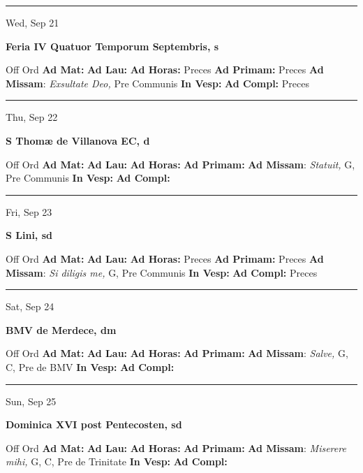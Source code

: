 \documentclass[letterpaper, 10pt]{article}
\begin{document}
\hrule
\begin{center}
Wed, Sep 21
\end{center}\textbf{ \large Feria IV Quatuor Temporum Septembris, \textnormal{\normalsize s}}
\begin{justify}
Off Ord
\textbf{Ad Mat: }
\textbf{Ad Lau: }
\textbf{Ad Horas: }Preces
\textbf{Ad Primam: }Preces
\textbf{Ad Missam}: \textit{Exsultate Deo,} Pre Communis
\textbf{In Vesp: }
\textbf{Ad Compl: }Preces\end{justify}



\hrule
\begin{center}
Thu, Sep 22
\end{center}\textbf{ \large S Thomæ de Villanova EC, \textnormal{\normalsize d}}
\begin{justify}
Off Ord
\textbf{Ad Mat: }
\textbf{Ad Lau: }
\textbf{Ad Horas: }
\textbf{Ad Primam: }
\textbf{Ad Missam}: \textit{Statuit,} G, Pre Communis
\textbf{In Vesp: }
\textbf{Ad Compl: }\end{justify}



\hrule
\begin{center}
Fri, Sep 23
\end{center}\textbf{ \large S Lini, \textnormal{\normalsize sd}}
\begin{justify}
Off Ord
\textbf{Ad Mat: }
\textbf{Ad Lau: }
\textbf{Ad Horas: }Preces
\textbf{Ad Primam: }Preces
\textbf{Ad Missam}: \textit{Si diligis me,} G, Pre Communis
\textbf{In Vesp: }
\textbf{Ad Compl: }Preces\end{justify}



\hrule
\begin{center}
Sat, Sep 24
\end{center}\textbf{ \large BMV de Merdece, \textnormal{\normalsize dm}}
\begin{justify}
Off Ord
\textbf{Ad Mat: }
\textbf{Ad Lau: }
\textbf{Ad Horas: }
\textbf{Ad Primam: }
\textbf{Ad Missam}: \textit{Salve,} G, C, Pre de BMV
\textbf{In Vesp: }
\textbf{Ad Compl: }\end{justify}



\hrule
\begin{center}
Sun, Sep 25
\end{center}\textbf{ \large Dominica XVI post Pentecosten, \textnormal{\normalsize sd}}
\begin{justify}
Off Ord
\textbf{Ad Mat: }
\textbf{Ad Lau: }
\textbf{Ad Horas: }
\textbf{Ad Primam: }
\textbf{Ad Missam}: \textit{Miserere mihi,} G, C, Pre de Trinitate
\textbf{In Vesp: }
\textbf{Ad Compl: }\end{justify}
\end{document}
